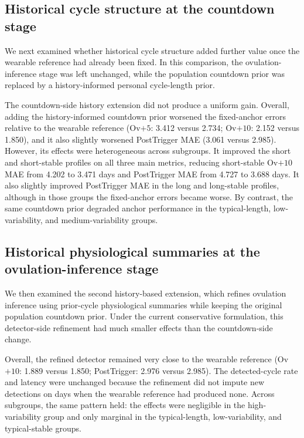 \documentclass[conference]{IEEEtran}
\begin{document}
\subsection{Historical cycle structure at the countdown stage}

We next examined whether historical cycle structure added further value once the wearable reference had already been fixed. In this comparison, the ovulation-inference stage was left unchanged, while the population countdown prior was replaced by a history-informed personal cycle-length prior.

The countdown-side history extension did not produce a uniform gain. Overall, adding the history-informed countdown prior worsened the fixed-anchor errors relative to the wearable reference (Ov$+5$: 3.412 versus 2.734; Ov$+10$: 2.152 versus 1.850), and it also slightly worsened PostTrigger MAE (3.061 versus 2.985). However, its effects were heterogeneous across subgroups. It improved the short and short-stable profiles on all three main metrics, reducing short-stable Ov$+10$ MAE from 4.202 to 3.471 days and PostTrigger MAE from 4.727 to 3.688 days. It also slightly improved PostTrigger MAE in the long and long-stable profiles, although in those groups the fixed-anchor errors became worse. By contrast, the same countdown prior degraded anchor performance in the typical-length, low-variability, and medium-variability groups.

\subsection{Historical physiological summaries at the ovulation-inference stage}

We then examined the second history-based extension, which refines ovulation inference using prior-cycle physiological summaries while keeping the original population countdown prior. Under the current conservative formulation, this detector-side refinement had much smaller effects than the countdown-side change.

Overall, the refined detector remained very close to the wearable reference (Ov$+10$: 1.889 versus 1.850; PostTrigger: 2.976 versus 2.985). The detected-cycle rate and latency were unchanged because the refinement did not impute new detections on days when the wearable reference had produced none. Across subgroups, the same pattern held: the effects were negligible in the high-variability group and only marginal in the typical-length, low-variability, and typical-stable groups.
\end{document}
